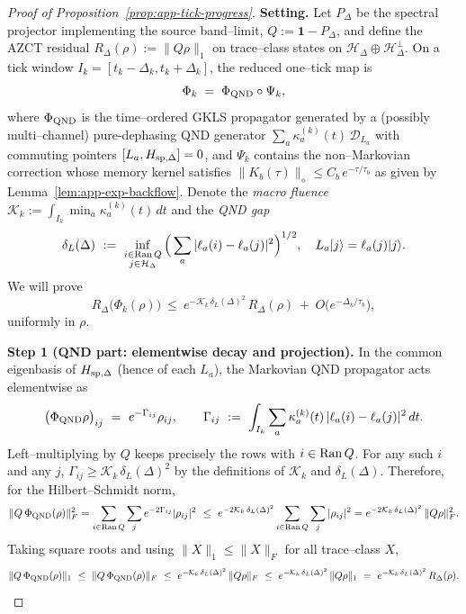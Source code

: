 \documentclass[10pt]{article}
\theoremstyle{definition}
\theoremstyle{plain}
\begin{document}
\begin{proof}[Proof of Proposition~\ref{prop:app-tick-progress}]
\textbf{Setting.}
Let \(P_\Delta\) be the spectral projector implementing the source band–limit, \(Q:=\mathbf 1-P_\Delta\), and define the AZCT residual
\(R_\Delta(\rho):=\|Q\rho\|_1\) on trace–class states on \(\mathcal H_\Delta\oplus \mathcal H_\Delta^\perp\).
On a tick window \(I_k=[t_k-\Delta_k,t_k+\Delta_k]\), the reduced one–tick map is
\[
\Phi_k \;=\; \Phi_{\rm QND}\circ \Psi_k,
\]
where \(\Phi_{\rm QND}\) is the time–ordered GKLS propagator generated by a (possibly multi–channel) pure-dephasing QND generator
\(
\sum_a \kappa_a^{(k)}(t)\,\mathcal D_{L_a}
\)
with commuting pointers \([L_a,H_{{\rm sp},\Delta}]=0\), and \(\Psi_k\) contains the non–Markovian correction whose memory kernel satisfies \(\|K_b(\tau)\|_\diamond\le C_b\,e^{-\tau/\tau_b}\) as given by Lemma~\ref{lem:app-exp-backflow}.
Denote the \emph{macro fluence}
\(
\mathcal K_k:=\int_{I_k}\min_a \kappa_a^{(k)}(t)\,dt
\)
and the \emph{QND gap}
\[
\delta_L(\Delta)\ :=\ \inf_{\substack{i\in{\rm Ran}\,Q\\ j\in\mathcal H_\Delta}} \Big(\sum_a |\ell_a(i)-\ell_a(j)|^2\Big)^{1/2},
\quad L_a|j\rangle=\ell_a(j)|j\rangle.
\]
We will prove
\[
R_\Delta\big(\Phi_k(\rho)\big)\ \le\ e^{-\mathcal K_k\,\delta_L(\Delta)^2}\,R_\Delta(\rho)\ +\ O\!\big(e^{-\Delta_k/\tau_b}\big),
\]
uniformly in \(\rho\).

\smallskip
\textbf{Step 1 (QND part: elementwise decay and projection).}
In the common eigenbasis of \(H_{{\rm sp},\Delta}\) (hence of each \(L_a\)), the Markovian QND propagator acts elementwise as
\begin{equation}\label{eq:qnd-action}
\big(\Phi_{\rm QND}\rho\big)_{ij}\ =\ e^{-\Gamma_{ij}}\rho_{ij},
\qquad
\Gamma_{ij}\ :=\ \int_{I_k}\sum_a \kappa_a^{(k)}(t)\,|\ell_a(i)-\ell_a(j)|^2\,dt.
\end{equation}
Left–multiplying by \(Q\) keeps precisely the rows with \(i\in{\rm Ran}\,Q\). For any such \(i\) and any \(j\),
\(
\Gamma_{ij}\ge \mathcal K_k\,\delta_L(\Delta)^2
\)
by the definitions of \(\mathcal K_k\) and \(\delta_L(\Delta)\).
Therefore, for the Hilbert–Schmidt norm,
\[
\|Q\,\Phi_{\rm QND}(\rho)\|_F^2
=\sum_{i\in{\rm Ran}\,Q}\sum_j e^{-2\Gamma_{ij}}|\rho_{ij}|^2
\ \le\ e^{-2\mathcal K_k\,\delta_L(\Delta)^2}\sum_{i\in{\rm Ran}\,Q}\sum_j |\rho_{ij}|^2
= e^{-2\mathcal K_k\,\delta_L(\Delta)^2}\,\|Q\rho\|_F^2.
\]
Taking square roots and using \(\|X\|_1\le \|X\|_F\) for all trace–class \(X\),
\begin{equation}\label{eq:qnd-contract}
\|Q\,\Phi_{\rm QND}(\rho)\|_1\ \le\ \|Q\,\Phi_{\rm QND}(\rho)\|_F
\ \le\ e^{-\mathcal K_k\,\delta_L(\Delta)^2}\,\|Q\rho\|_F
\ \le\ e^{-\mathcal K_k\,\delta_L(\Delta)^2}\,\|Q\rho\|_1
\ =\ e^{-\mathcal K_k\,\delta_L(\Delta)^2}\,R_\Delta(\rho).
\end{equation}


\end{proof}
\end{document}
